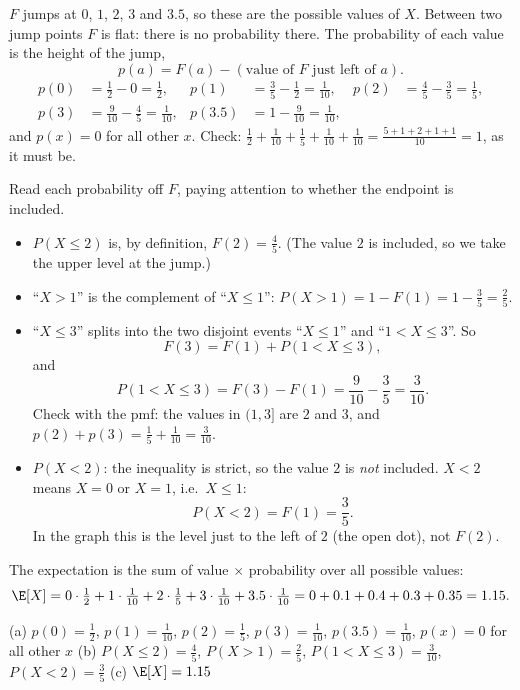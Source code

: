\begin{solution}
	 $F$ jumps at $0$, $1$, $2$, $3$ and $3.5$, so these are the
	possible values of $X$. Between two jump points $F$ is flat: there is no
	probability there. The probability of each value is the height of the jump,
	\[ p(a)=F(a)-(\text{value of $F$ just left of $a$}). \]
	\[
		\begin{aligned}
			p(0)   & =\tfrac12-0=\tfrac12,                     &
			p(1)   & =\tfrac35-\tfrac12=\tfrac{1}{10},         &
			p(2)   & =\tfrac45-\tfrac35=\tfrac15,                \\[4pt]
			p(3)   & =\tfrac{9}{10}-\tfrac45=\tfrac{1}{10},    &
			p(3.5) & =1-\tfrac{9}{10}=\tfrac{1}{10},
		\end{aligned}
	\]
	and $p(x)=0$ for all other $x$.
	Check: $\frac12+\frac1{10}+\frac15+\frac1{10}+\frac1{10}
		=\frac{5+1+2+1+1}{10}=1$, as it must be.

	 Read each probability off $F$, paying attention to whether the
	endpoint is included.
	\begin{itemize}
		\item $P(X\le 2)$ is, by definition, $F(2)=\frac45$. (The value $2$ is
		      included, so we take the upper level at the jump.)
		\item ``$X>1$'' is the complement of ``$X\le1$'':
		      $P(X>1)=1-F(1)=1-\frac35=\frac25$.
		\item ``$X\le3$'' splits into the two disjoint events ``$X\le1$'' and
		      ``$1<X\le3$''. So
		      \[ F(3)=F(1)+P(1<X\le3), \]
		      and
		      \[ P(1<X\le3)=F(3)-F(1)=\frac{9}{10}-\frac35=\frac{3}{10}. \]
		      Check with the pmf: the values in $(1,3]$ are $2$ and $3$, and
		      $p(2)+p(3)=\frac15+\frac1{10}=\frac3{10}$.
		\item $P(X<2)$: the inequality is strict, so the value $2$ is
		      \emph{not} included. $X<2$ means $X=0$ or $X=1$, i.e.\ $X\le1$:
		      \[ P(X<2)=F(1)=\frac35. \]
		      In the graph this is the level just to the left of $2$ (the open
		      dot), not $F(2)$.
	\end{itemize}

	 The expectation is the sum of value $\times$ probability over
	all possible values:
	\[
		\E[X]=0\cdot\tfrac12+1\cdot\tfrac1{10}+2\cdot\tfrac15+3\cdot\tfrac1{10}
		+3.5\cdot\tfrac1{10}=0+0.1+0.4+0.3+0.35=1.15.
	\]

	\begin{answer}
		(a) $p(0)=\frac12$, $p(1)=\frac1{10}$, $p(2)=\frac15$,
		$p(3)=\frac1{10}$, $p(3.5)=\frac1{10}$, $p(x)=0$ for all other $x$ \quad
		(b) $P(X\le2)=\frac45$, $P(X>1)=\frac25$, $P(1<X\le3)=\frac3{10}$,
		$P(X<2)=\frac35$ \quad
		(c) $\E[X]=1.15$
	\end{answer}
\end{solution}
